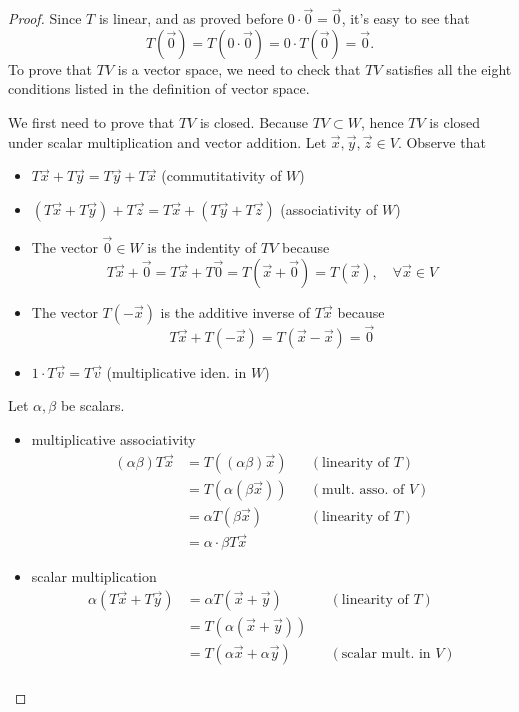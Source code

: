 \documentclass{article}
\begin{document}
\begin{proof}
  Since $T$ is linear, and as proved before $0\cdot\vec{0}=\vec{0}$, 
  it's easy to see that 
  $$T(\vec{0})=T(0\cdot\vec{0})=0\cdot T(\vec{0})=\vec{0}.$$
  To prove that $TV$ is a vector space, we need to check that $TV$ satisfies
  all the eight conditions listed in the definition of vector space.

  We first need to prove that $TV$ is closed.
  Because $TV\subset W$, hence $TV$ is closed under scalar multiplication and
  vector addition. Let $\vec{x},\vec{y},\vec{z}\in V$. Observe that
  \begin{itemize}
    \item $T\vec{x}+T\vec{y}=T\vec{y}+T\vec{x}$
      \quad (commutitativity of $W$)
    \item $(T\vec{x}+T\vec{y})+T\vec{z}=T\vec{x}+(T\vec{y}+T\vec{z})$
      \quad (associativity of $W$)
    \item The vector $\vec{0}\in W$ is the indentity of $TV$ because 
      \[
        T\vec{x}+\vec{0}=T\vec{x}+T\vec{0}=T(\vec{x}+\vec{0})=T(\vec{x}),\quad 
        \forall \vec{x}\in V
      \]
    \item The vector $T(-\vec{x})$ is the additive inverse of $T\vec{x}$ because
      \[T\vec{x}+T(-\vec{x})=T(\vec{x}-\vec{x})=\vec{0}\]
    \item $1\cdot T\vec{v}=T\vec{v}$
      \quad (multiplicative iden. in $W$)
  \end{itemize}
  Let $\alpha, \beta$ be scalars.
  \begin{itemize}
    \item multiplicative associativity
      \begin{align*}
        (\alpha\beta)T\vec{x} 
        &= T((\alpha\beta)\vec{x})
        && (\text{linearity of $T$})\\
        &= T(\alpha (\beta\vec{x})) 
        && (\text{mult. asso. of $V$})\\
        &= \alpha T(\beta\vec{x})
        && (\text{linearity of $T$})\\
        &= \alpha\cdot\beta T\vec{x}
      \end{align*}
    \item scalar multiplication
      \begin{align*}
        \alpha(T\vec{x}+T\vec{y})
        &=\alpha T(\vec{x}+\vec{y}) && (\text{linearity of $T$})\\
        &=T(\alpha(\vec{x}+\vec{y})) \\
        &=T(\alpha\vec{x}+\alpha\vec{y}) && (\text{scalar mult. in $V$})\\

\end{align*}
\end{itemize}
\end{proof}
\end{document}

